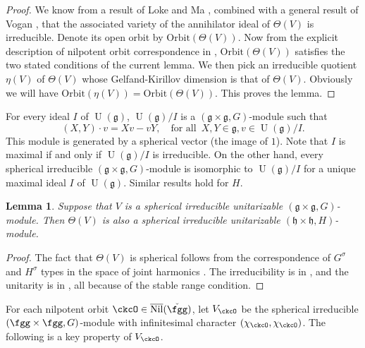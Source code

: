 \documentclass[12pt,a4paper]{amsart}
\newcommand{\oU}{\operatorname{U}}
\newcommand{\g}{\mathfrak g}
\newcommand{\h}{\mathfrak h}
\numberwithin{equation}{section}
\newtheorem{lem}[thm]{Lemma}
\theoremstyle{remark}
\def\chico{\chi_{\ckcO}}
\begin{document}
\begin{proof} We know from a result of Loke and Ma \cite[Theorem D]{LM}, combined with a general result of Vogan \cite[Theorem 8.4]{Vo89}, that the associated variety of the annihilator ideal of $\Theta (V)$ is irreducible. Denote its open orbit by $\mathrm{Orbit}(\Theta(V))$. Now from the explicit description of nilpotent orbit correspondence in \cite{DKPC}, $\mathrm{Orbit}(\Theta(V))$ satisfies the two stated conditions of the current lemma.
We then pick an irreducible quotient $\eta(V)$ of $\Theta(V)$ whose Gelfand-Kirillov dimension is that of $\Theta(V)$. Obviously we will have $\mathrm{Orbit}(\eta(V))=\mathrm{Orbit}(\Theta(V))$. This proves the lemma.
\end{proof}


For every ideal $I$ of $\oU(\g)$, $\oU(\g)/I$ is a $(\g\times \g, G)$-module such that
\[
  (X, Y)\cdot v=Xv-vY, \quad \textrm{for all } \, X, Y\in \g, v\in \oU(\g)/I.
\]
This module is generated by a spherical vector (the image of $1$).  Note that $I$ is maximal if and
only if $\oU(\g)/I$ is irreducible. On the other hand, every spherical
irreducible $(\g\times \g, G)$-module is isomorphic to $\oU(\g)/I$ for a unique
maximal ideal $I$ of $\oU(\g)$. Similar results hold for $H$.


\begin{lem}\label{theta4}
Suppose that $V$ is a spherical irreducible unitarizable $(\g\times \g, G)$-module. Then $\Theta(V)$ is also a spherical irreducible unitarizable $(\h\times \h, H)$-module.
\end{lem}

\begin{proof} The fact that $\Theta(V)$ is spherical follows from the correspondence of $G^{\sigma}$ and $H^{\sigma}$ types in the space of
joint harmonics \cite[Section 3]{Howe89}. The irreducibility is in \cite[Theorem~A]{LM}, and the unitarity is in \cite{Li89}, all because of the stable range condition.
\end{proof}


\medskip

For each nilpotent orbit $\ckcO\in \overline{\mathrm{Nil}}(\check \fgg)$,
let $V_{\ckcO}$ be the spherical irreducible $(\fgg\times \fgg, G)$-module with
infinitesimal character $(\chico, \chico)$. The following is a key property of $V_{\ckcO}$.
\end{document}
